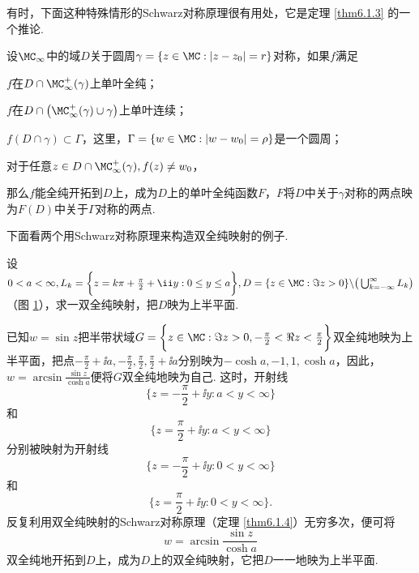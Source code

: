 有时，下面这种特殊情形的Schwarz对称原理很有用处，它是定理 \ref{thm6.1.3} 的一个推论.
\begin{theorem}\label{thm6.1.4}
设$\MC_\infty$中的域$D$关于圆周$\gamma=\{z\in\MC:|z-z_0|=r\}$对称，如果$f$满足
\begin{eenum}
  \item $f$在$D\cap\MC_\infty^+(\gamma)$上单叶全纯；
  \item $f$在$D\cap\big(\MC_\infty^+(\gamma)\cup\gamma\big)$上单叶连续；
  \item $f(D\cap\gamma)\subset\Gamma$，这里，$\Gamma=\{w\in\MC:|w-w_0|=\rho\}$是一个圆周；
  \item 对于任意$z\in D\cap\MC_\infty^+(\gamma),f(z)\ne w_0$，
\end{eenum}
那么$f$能全纯开拓到$D$上，成为$D$上的单叶全纯函数$F$，$F$将$D$中关于$\gamma$对称的两点映为$F(D)$中关于$\Gamma$对称的两点.
\end{theorem}

下面看两个用Schwarz对称原理来构造双全纯映射的例子.
\begin{example}\label{exam6.1.5}
设$0<a<\infty,L_k=\bigg\{z=k\pi+\frac\pi2+\ii y:0\le y\le a\bigg\},D=\{z\in\MC:\Im z>0\}\backslash\big(\bigcup_{k=-\infty}^\infty L_k\big)$（图 \ref{fig6.2}），求一双全纯映射，把$D$映为上半平面.
\end{example}
\begin{figure}[!ht]
\centering
{}
\caption{\label{fig6.2}}
\end{figure}
\begin{solution}
已知$w=\sin z$把半带状域$G=\bigg\{z\in\MC:\Im z>0,-\frac\pi2<\Re z<\frac\pi2\bigg\}$双全纯地映为上半平面，把点$-\frac\pi2+\ii a,-\frac\pi2,\frac\pi2,\frac\pi2+\ii a$分别映为$-\cosh a,-1,1,\cosh a$，因此，$w=\arcsin\frac{\sin z}{\cosh a}$便将$G$双全纯地映为自己. 这时，开射线
\[\bigg\{z=-\frac\pi2+\ii y:a<y<\infty\bigg\}\]
和
\[\bigg\{z=\frac\pi2+\ii y:a<y<\infty\bigg\}\]
分别被映射为开射线
\[\bigg\{z=-\frac\pi2+\ii y:0<y<\infty\bigg\}\]
和
\[\bigg\{z=\frac\pi2+\ii y:0<y<\infty\bigg\}.\]
反复利用双全纯映射的Schwarz对称原理（定理 \ref{thm6.1.4}）无穷多次，便可将
\[w=\arcsin\frac{\sin z}{\cosh a}\]
双全纯地开拓到$D$上，成为$D$上的双全纯映射，它把$D$一一地映为上半平面.
\end{solution}

